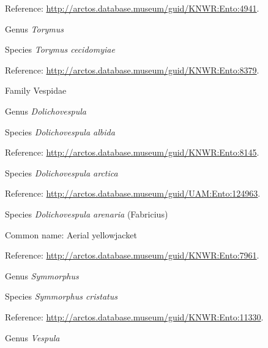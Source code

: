 \documentclass[9pt, article]{memoir}
\begin{document}
\begin{multicols}{2}
Reference: 
\url{http://arctos.database.museum/guid/KNWR:Ento:4941}.

\vspace{6pt}\noindent\hspace{30pt}Genus \textit{Torymus}


\vspace{6pt}\noindent\hspace{36pt}Species \textit{Torymus cecidomyiae}


Reference: 
\url{http://arctos.database.museum/guid/KNWR:Ento:8379}.

\vspace{6pt}\noindent\hspace{24pt}Family Vespidae


\vspace{6pt}\noindent\hspace{30pt}Genus \textit{Dolichovespula}


\vspace{6pt}\noindent\hspace{36pt}Species \textit{Dolichovespula albida}


Reference: 
\url{http://arctos.database.museum/guid/KNWR:Ento:8145}.

\vspace{6pt}\noindent\hspace{36pt}Species \textit{Dolichovespula arctica}


Reference: 
\url{http://arctos.database.museum/guid/UAM:Ento:124963}.

\vspace{6pt}\noindent\hspace{36pt}Species \textit{Dolichovespula arenaria} (Fabricius)


Common name: Aerial yellowjacket

Reference: 
\url{http://arctos.database.museum/guid/KNWR:Ento:7961}.

\vspace{6pt}\noindent\hspace{30pt}Genus \textit{Symmorphus}


\vspace{6pt}\noindent\hspace{36pt}Species \textit{Symmorphus cristatus}


Reference: 
\url{http://arctos.database.museum/guid/KNWR:Ento:11330}.

\vspace{6pt}\noindent\hspace{30pt}Genus \textit{Vespula}



\end{multicols}
\end{document}
